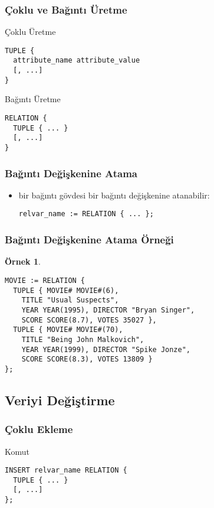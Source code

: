 \documentclass[dvipsnames]{beamer}
\theoremstyle{definition}
\theoremstyle{example}
\newtheorem{ornek}[theorem]{Örnek}
\theoremstyle{plain}
\begin{document}
\begin{frame}[fragile]
  \frametitle{Çoklu ve Bağıntı Üretme}

  \begin{block}{Çoklu Üretme}
    \begin{lstlisting}
TUPLE {
  attribute_name attribute_value
  [, ...]
}
    \end{lstlisting}
  \end{block}

  \pause
  \begin{block}{Bağıntı Üretme}
    \begin{lstlisting}
RELATION {
  TUPLE { ... }
  [, ...]
}
    \end{lstlisting}
  \end{block}
\end{frame}

\begin{frame}[fragile]
  \frametitle{Bağıntı Değişkenine Atama}

  \begin{itemize}
    \item bir bağıntı gövdesi bir bağıntı değişkenine atanabilir:
    \begin{lstlisting}
relvar_name := RELATION { ... };
    \end{lstlisting}
  \end{itemize}
\end{frame}

\begin{frame}[fragile]
  \frametitle{Bağıntı Değişkenine Atama Örneği}

  \begin{ornek}
    \begin{lstlisting}
MOVIE := RELATION {
  TUPLE { MOVIE# MOVIE#(6),
    TITLE "Usual Suspects",
    YEAR YEAR(1995), DIRECTOR "Bryan Singer",
    SCORE SCORE(8.7), VOTES 35027 },
  TUPLE { MOVIE# MOVIE#(70),
    TITLE "Being John Malkovich",
    YEAR YEAR(1999), DIRECTOR "Spike Jonze",
    SCORE SCORE(8.3), VOTES 13809 }
};
    \end{lstlisting}
  \end{ornek}
\end{frame}

\subsection{Veriyi Değiştirme}

\begin{frame}[fragile]
  \frametitle{Çoklu Ekleme}

  \begin{block}{Komut}
    \begin{lstlisting}
INSERT relvar_name RELATION {
  TUPLE { ... }
  [, ...]
};
    \end{lstlisting}
  \end{block}
\end{frame}
\end{document}
